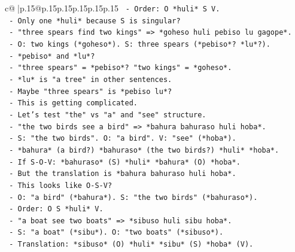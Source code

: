 \documentclass{article}
\begin{document}
{\begin{supertabular}{c@{$\;$}|p{.15\linewidth}@{}p{.15\linewidth}p{.15\linewidth}p{.15\linewidth}p{.15\linewidth}p{.15\linewidth}}
{{{\texttt{                        {-} Order: O *huli* S V.} \\
\texttt{                        {-} Only one *huli* because S is singular?} \\
\texttt{                      {-} "three spears find two kings" => *goheso huli pebiso lu gagope*.} \\
\texttt{                        {-} O: two kings (*goheso*). S: three spears (*pebiso*? *lu*?).} \\
\texttt{                        {-} *pebiso* and *lu*?} \\
\texttt{                        {-} "three spears" = *pebiso*? "two kings" = *goheso*.} \\
\texttt{                        {-} *lu* is "a tree" in other sentences.} \\
\texttt{                        {-} Maybe "three spears" is *pebiso lu*?} \\
\texttt{                        {-} This is getting complicated.} \\
\texttt{                        {-} Let's test "the" vs "a" and "see" structure.} \\
\texttt{                        {-} "the two birds see a bird" => *bahura bahuraso huli hoba*.} \\
\texttt{                          {-} S: "the two birds". O: "a bird". V: "see" (*hoba*).} \\
\texttt{                          {-} *bahura* (a bird?) *bahuraso* (the two birds?) *huli* *hoba*.} \\
\texttt{                          {-} If S{-}O{-}V: *bahuraso* (S) *huli* *bahura* (O) *hoba*.} \\
\texttt{                          {-} But the translation is *bahura bahuraso huli hoba*.} \\
\texttt{                          {-} This looks like O{-}S{-}V?} \\
\texttt{                          {-} O: "a bird" (*bahura*). S: "the two birds" (*bahuraso*).} \\
\texttt{                          {-} Order: O S *huli* V.} \\
\texttt{                          {-} "a boat see two boats" => *sibuso huli sibu hoba*.} \\
\texttt{                            {-} S: "a boat" (*sibu*). O: "two boats" (*sibuso*).} \\
\texttt{                            {-} Translation: *sibuso* (O) *huli* *sibu* (S) *hoba* (V).} \\
}}}
\end{supertabular}}
\end{document}
